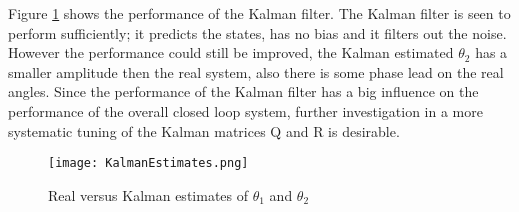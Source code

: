 \documentclass[main.tex]{subfiles}
\begin{document}
Figure \ref{fig:KalmanFilterP} shows the performance of the Kalman filter. The Kalman filter is seen to perform sufficiently; it predicts the states, has no bias and it filters out the noise. However the performance could still be improved, the Kalman estimated $\theta_2$ has a smaller amplitude then the real system, also there is some phase lead on the real angles. Since the performance of the Kalman filter has a big influence on the performance of the overall closed loop system, further investigation in a more systematic tuning of the Kalman matrices Q and R is desirable.   
\begin{figure}[H]
\centering
\texttt{[image: KalmanEstimates.png]}
\caption{\label{fig:KalmanFilterP} Real versus Kalman estimates of $\theta_1$ and $\theta_2$} 
\end{figure}
\end{document}
